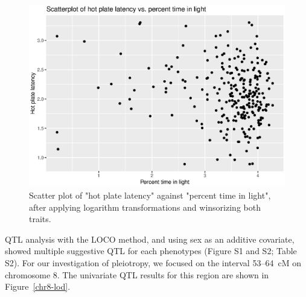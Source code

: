 \documentclass[12pt,twoside, lineno]{gsajnl}
\begin{document}
\begin{figure}
\includegraphics[width = \textwidth]{../Rmd/scatter.eps}
\caption{Scatter plot of "hot plate latency" against "percent time in
  light", after applying logarithm transformations and winsorizing
  both traits.}
\label{fig:scatter}
\end{figure}

QTL analysis with the LOCO method, and using sex as an additive
covariate, showed multiple suggestive QTL for each
phenotypes (Figure S1 and S2; Table S2). For our investigation of
pleiotropy, we focused on the interval 53--64~cM on chromosome 8.
The univariate QTL results for this region are shown in
Figure~\ref{chr8-lod}.
\end{document}
